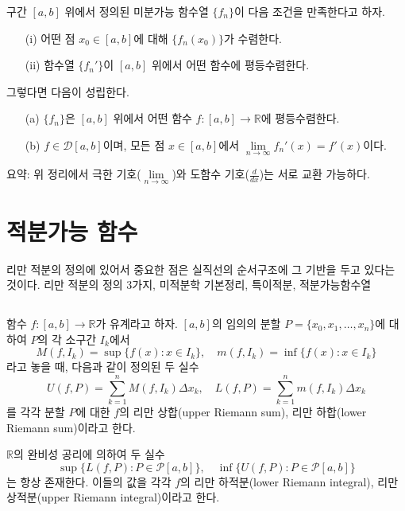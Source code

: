 \documentclass{article}
\begin{document}
구간 \([a,b]\) 위에서 정의된 미분가능 함수열 \(\{f_n\}\)이 다음 조건을 만족한다고 하자.
\begin{itemize}
    \item[(i)] 어떤 점 \(x_0 \in [a,b]\)에 대해 \(\{f_n(x_0)\}\)가 수렴한다.
    \item[(ii)] 함수열 \(\{f_n'\}\)이 \([a,b]\) 위에서 어떤 함수에 평등수렴한다.
\end{itemize}
그렇다면 다음이 성립한다.
\begin{itemize}
    \item[(a)] \(\{f_n\}\)은 \([a,b]\) 위에서 어떤 함수 \(f: [a,b] \to \mathbb{R}\)에 평등수렴한다.
    \item[(b)] \(f \in \mathcal{D}[a,b]\)이며, 모든 점 \(x \in [a,b]\)에서 \(\lim\limits_{n \to \infty} f_n'(x) = f'(x)\)이다.
\end{itemize}

요약: 위 정리에서 극한 기호(\(\lim\limits_{n \to \infty}\))와 도함수 기호(\(\frac{d}{dx}\))는 서로 교환 가능하다.







\setcounter{section}{4}

\section{적분가능 함수}
리만 적분의 정의에 있어서 중요한 점은 실직선의 순서구조에 그 기반을 두고 있다는 것이다. 리만 적분의 정의 3가지, 미적분학 기본정리, 특이적분, 적분가능함수열


\subsection{\fontsize{11.5}{13}\selectfont{리만적분의 정의(1)}}

함수 \( f: [a, b] \to \mathbb{R} \)가 유계라고 하자. \( [a, b] \)의 임의의 분할 \( P = \{ x_0, x_1, \dots, x_n \} \)에 대하여
\( P \)의 각 소구간 \( I_k \)에서 
\[
M(f, I_k) = \sup\{ f(x) : x \in I_k \}, \quad m(f, I_k) = \inf\{ f(x) : x \in I_k \}
\]
라고 놓을 때, 다음과 같이 정의된 두 실수
\[
U(f, P) = \sum_{k=1}^{n} M(f, I_k) \Delta x_k, \quad L(f, P) = \sum_{k=1}^{n} m(f, I_k) \Delta x_k
\]
를 각각 분할 \( P \)에 대한 \( f \)의 리만 상합(upper Riemann sum), 리만 하합(lower Riemann sum)이라고 한다.


\( \mathbb{R} \)의 완비성 공리에 의하여 두 실수
\[
\sup\{ L(f, P) : P \in \mathcal{P}[a, b] \}, \quad \inf\{ U(f, P) : P \in \mathcal{P}[a, b] \}
\]
는 항상 존재한다. 이들의 값을 각각 \( f \)의 리만 하적분(lower Riemann integral), 리만 상적분(upper Riemann integral)이라고 한다.
\end{document}
